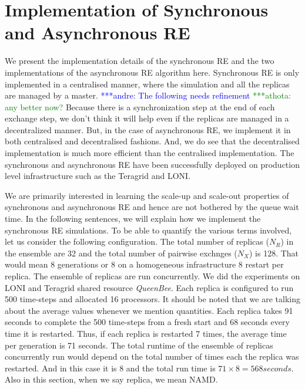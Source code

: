 \documentclass{rspublic}
\newcommand{\alnote}[1]{ {\textcolor{blue} { ***andre: #1 }}}
\newcommand{\athotanote}[1]{ {\textcolor{green} { ***athota: #1 }}}
\newcommand{\alnote}[1]{}
\newcommand{\athotanote}[1]{}
\begin{document}
\section{Implementation of Synchronous and Asynchronous RE}
We present the implementation details of the synchronous RE and the two 
implementations of the asynchronous RE algorithm here. Synchronous RE is 
only implemented in a centralised manner, where the simulation and all the 
replicas are managed by a master. 
\alnote{The following needs refinement}\athotanote{any better now?} Because there is a synchronization step at the end of each exchange step, we don't think it will help even if the replicas are managed in a decentralized manner. %
But, in the case of asynchronous RE, we implement it in both 
centralised and decentralised  fashions. And, we do see that the decentralised 
implementation is much more efficient than the centralised implementation.
The synchronous and asynchronous RE have been successfully deployed on production 
level infrastructure such as the Teragrid and LONI. 

We are primarily interested in learning the scale-up and scale-out properties of synchronous and asynchronous RE and hence are not bothered by the queue wait time. In the following sentences, we will explain how we implement the synchronous RE simulations. To be able to quantify the various terms involved, let us consider the following configuration. The total number of replicas ($N_R$) in the ensemble are 32 and the total number of pairwise exchnges ($N_X$) is 128. That would mean 8 generations or 8 on a homogeneous infrastructure 8 restart per replica. The ensemble of replicas are run concurrently. We did the experiments on LONI and Teragrid shared resource \emph{QueenBee}. Each replica is configured to run 500 time-steps and allocated 16 processors. It should be noted that we are talking about the average values whenever we mention quantities. Each replica takes 91 seconds to complete the 500 time-steps from a fresh start and 68 seconds every time it is restarted. Thus, if each replica is restarted 7 times, the average time per generation is 71 seconds. The total runtime of the ensemble of replicas concurrently run would depend on the total number of times each the replica was restarted. And in this case it is 8 and the total run time is $71 \times 8 = 568 seconds.$ Also in this section, when we say replica, we mean NAMD.
\end{document}
